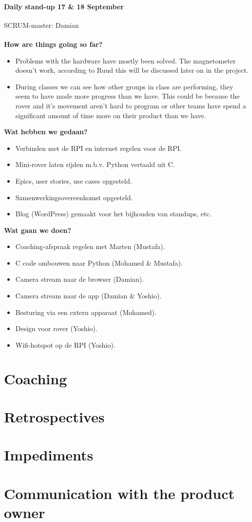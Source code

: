 \documentclass[12pt]{article}
\begin{document}
	\paragraph{Daily stand-up 17 \& 18 September}
	SCRUM-master: Damian\\
	\\\textbf{How are things going so far?}
	\begin{itemize}
		\item Problems with the hardware have mostly been solved. The magnetometer doesn't work, according to Ruud this will be discussed later on in the project.
		\item During classes we can see how other groups in class are performing, they seem to have made more progress than we have. This could be because the rover and it's movement aren't hard to program or other teams have spend a significant amount of time more on their product than we have.
	\end{itemize}
	\textbf{Wat hebben we gedaan?}
	\begin{itemize}
		\item Verbinden met de RPI en internet regelen voor de RPI.
		\item Mini-rover laten rijden m.b.v. Python vertaald uit C.
		\item Epics, user stories, use cases opgesteld.
		\item Samenwerkingsovereenkomst opgesteld.
		\item Blog (WordPress) gemaakt voor het bijhouden van standups, etc.
	\end{itemize}
	\textbf{Wat gaan we doen?}
	\begin{itemize}
		\item Coaching-afspraak regelen met Marten (Mustafa).
		\item C code  ombouwen naar Python (Mohamed \& Mustafa).
		\item Camera stream naar de browser (Damian).
		\item Camera stream naar de app (Damian \& Yoshio).
		\item Besturing via een extern apparaat (Mohamed).
		\item Design voor rover (Yoshio).
		\item Wifi-hotspot op de RPI (Yoshio).
	\end{itemize}
	
	
	\section{Coaching}
	\section{Retrospectives}
	\section{Impediments}
	\section{Communication with the product owner}
\end{document}

